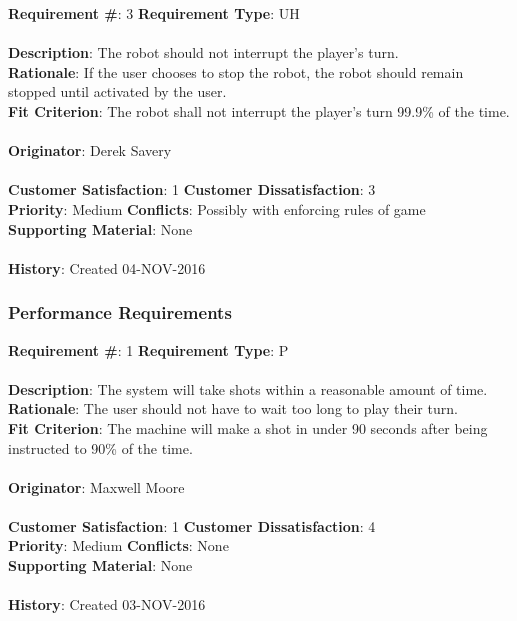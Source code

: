 \documentclass[titlepage]{article}
\begin{document}
\begin{framed}
	\noindent\textbf{Requirement \#}: 3 \hfill \textbf{Requirement Type}: UH \hfill\\\\
	\noindent\textbf{Description}: The robot should not interrupt the player's turn.\\
	\textbf{Rationale}: If the user chooses to stop the robot, the robot should remain stopped until activated by the user.\\
	\textbf{Fit Criterion}: The robot shall not interrupt the player's turn 99.9\% of the time.\\\\
	\textbf{Originator}: Derek Savery\\\\
	\noindent\textbf{Customer Satisfaction}: 1 \hfill 	\textbf{Customer Dissatisfaction}: 3 \hfill\\
	\textbf{Priority}: Medium \hfill \textbf{Conflicts}: Possibly with enforcing rules of game \hfill\\
	\textbf{Supporting Material}: None\\\\
	\noindent\textbf{History}: Created 04-NOV-2016
\end{framed}

\subsubsection{Performance Requirements}
\begin{framed}
	\noindent\textbf{Requirement \#}: 1 \hfill \textbf{Requirement Type}: P\hfill\\\\
	\noindent\textbf{Description}: The system will take shots within a reasonable amount of time.\\
	\textbf{Rationale}: The user should not have to wait too long to play their turn.\\
	\textbf{Fit Criterion}: The machine will make a shot in under 90 seconds after being instructed to 90\% of the time.\\\\
	\textbf{Originator}: Maxwell Moore\\\\
	\noindent\textbf{Customer Satisfaction}: 1 \hfill 	\textbf{Customer Dissatisfaction}: 4 \hfill\\
	\textbf{Priority}: Medium \hfill \textbf{Conflicts}: None \hfill\\
	\textbf{Supporting Material}: None\\\\
	\noindent\textbf{History}: Created 03-NOV-2016
\end{framed}
\end{document}
